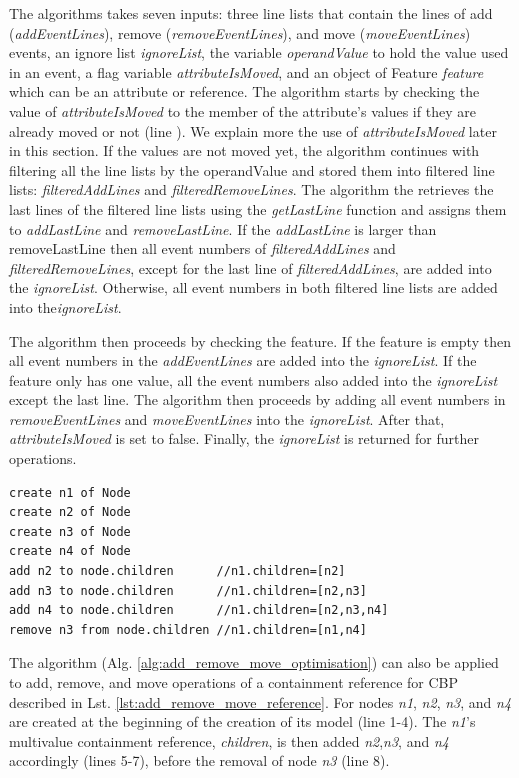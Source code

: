 \documentclass{llncs}
\begin{document}
The algorithms takes seven inputs: three line lists that contain the lines of add (\emph{addEventLines}), remove (\emph{removeEventLines}), and move (\emph{moveEventLines}) events, an ignore list \emph{ignoreList}, the variable \emph{operandValue} to hold the value used in an event, a flag variable \emph{attributeIsMoved}, and an object of Feature \emph{feature} which can be an attribute or reference. The algorithm starts by checking the value of \emph{attributeIsMoved} to the member of the attribute's values if they are already moved or not (line ). We explain more the use of \emph{attributeIsMoved} later in this section. If the values are not moved yet, the algorithm continues with filtering all the line lists by the operandValue and stored them into filtered line lists: \emph{filteredAddLines} and \emph{filteredRemoveLines}. The algorithm the retrieves the last lines of the filtered line lists using the \emph{getLastLine} function and assigns them to \emph{addLastLine} and \emph{removeLastLine}. If the \emph{addLastLine} is larger than {removeLastLine} then all event numbers of \emph{filteredAddLines} and \emph{filteredRemoveLines}, except for the last line of \emph{filteredAddLines}, are added into the \emph{ignoreList}. Otherwise, all event numbers in both filtered line lists are added into the\emph{ignoreList}.

The algorithm then proceeds by checking the feature. If the feature is empty then all event numbers in the \emph{addEventLines} are added into the \emph{ignoreList}. If the feature only has one value, all the event numbers also added into the \emph{ignoreList} except the last line. The algorithm then proceeds by adding all event numbers in \emph{removeEventLines} and \emph{moveEventLines} into the \emph{ignoreList}. After that, \emph{attributeIsMoved} is set to false. Finally, the \emph{ignoreList} is returned for further operations.     

\begin{lstlisting}[style=eol,caption={Example of CBP representation of attribute \emph{values}'s add and remove operations.},label=lst:add_remove_move_reference]
create n1 of Node
create n2 of Node
create n3 of Node
create n4 of Node
add n2 to node.children      //n1.children=[n2] 
add n3 to node.children      //n1.children=[n2,n3] 
add n4 to node.children      //n1.children=[n2,n3,n4] 
remove n3 from node.children //n1.children=[n1,n4] 
\end{lstlisting}

The algorithm (Alg. \ref{alg:add_remove_move_optimisation}) can also be applied to add, remove, and move operations of a containment reference for CBP described in Lst. \ref{lst:add_remove_move_reference}. For nodes \emph{n1}, \emph{n2}, \emph{n3}, and \emph{n4} are created at the beginning of the creation of its model (line 1-4). The \emph{n1}'s multivalue containment reference, \emph{children}, is then added \emph{n2},\emph{n3}, and \emph{n4} accordingly (lines 5-7), before the removal of node \emph{n3} (line 8). 
\end{document}
